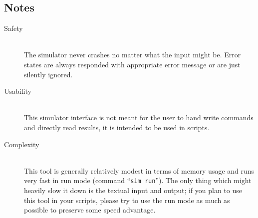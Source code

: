     \subsection{Notes}
        \begin{description}
            \item[Safety]~\\
                The simulator never crashes no matter what the input might be. Error states are always responded with appropriate error message or are just silently ignored.
            \item[Usability]~\\
                This simulator interface is not meant for the user to hand write commands and directly read results, it is intended to be used in scripts.
            \item[Complexity]~\\
                This tool is generally relatively modest in terms of memory usage and runs very fast in run mode (command ``\texttt{sim~run}''). The only thing which might heavily slow it down is the textual input and output; if you plan to use this tool in your scripts, please try to use the run mode as much as possible to preserve some speed advantage.
        \end{description}

